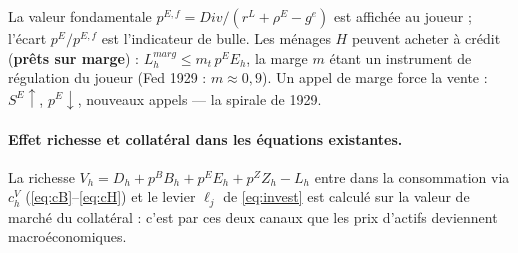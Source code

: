 \documentclass[11pt,a4paper]{article}
\begin{document}
La valeur fondamentale $p^{E,f} = Div/(r^L + \rho^E - g^e)$ est affichée au joueur ; l'écart $p^E/p^{E,f}$ est l'indicateur de bulle. Les ménages $H$ peuvent acheter à crédit (\textbf{prêts sur marge}) : $L^{marg}_h \le m_t\, p^E E_h$, la marge $m$ étant un instrument de régulation du joueur (Fed 1929 : $m \approx 0{,}9$). Un appel de marge force la vente : $S^E \uparrow$, $p^E \downarrow$, nouveaux appels --- la spirale de 1929.

\paragraph{Effet richesse et collatéral dans les équations existantes.} La richesse $V_h = D_h + p^B B_h + p^E E_h + p^Z Z_h - L_h$ entre dans la consommation via $c^V_h$ (\eqref{eq:cB}--\eqref{eq:cH}) et le levier $\ell_j$ de \eqref{eq:invest} est calculé sur la valeur de marché du collatéral : c'est par ces deux canaux que les prix d'actifs deviennent macroéconomiques.
\end{document}
